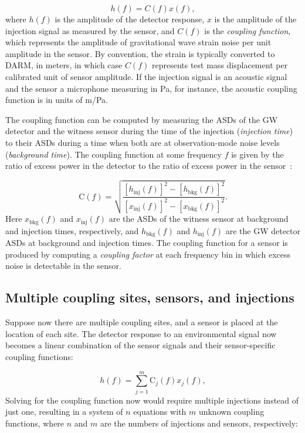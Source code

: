 \begin{equation}\label{eq:cf_model}
	h(f) = C(f) x(f),
\end{equation}
where $h(f)$ is the amplitude of the detector response, $x$ is the amplitude of the injection signal as measured by the sensor, and $C(f)$ is the \textit{coupling function}, which represents the amplitude of gravitational wave strain noise per unit amplitude in the sensor.
By convention, the strain is typically converted to \ac{DARM}, in meters, in which case $C(f)$ represents  test mass displacement per calibrated unit of sensor amplitude.
If the injection signal is an acoustic signal and the sensor a microphone measuring in Pa, for instance, the acoustic coupling function is in units of m/Pa.

The coupling function can be computed by measuring the \acp{ASD} of the \ac{GW} detector and the witness sensor during the time of the injection (\textit{injection time}) to their \acp{ASD} during a time when both are at observation-mode noise levels (\textit{background time}).
The coupling function at some frequency $f$ is given by the ratio of excess power in the detector to the ratio of excess power in the sensor~\citep{Kruk_2016, pem_code}:

\begin{equation}\label{eq:cf}
	\mathrm{C}(f) = \sqrt{\frac{[h_{\textrm{inj}}(f)]^2 - [h_{\textrm{bkg}}(f)]^2}{[x_{\textrm{inj}}(f)]^2 - [x_{\textrm{bkg}}(f)]^2}}.
\end{equation}
Here $x_{\textrm{bkg}}(f)$ and $x_{\textrm{inj}}(f)$ are the \acp{ASD} of the witness sensor at background and injection times, respectively, and $h_{\textrm{bkg}}(f)$ and $h_{\textrm{inj}}(f)$ are the \ac{GW} detector \acp{ASD} at background and injection times.
The coupling function for a sensor is produced by computing a \textit{coupling factor} at each frequency bin in which excess noise is detectable in the sensor.

\subsection{Multiple coupling sites, sensors, and injections}

Suppose now there are multiple coupling sites, and a sensor is placed at the location of each site.
The detector response to an environmental signal now becomes a linear combination of the sensor signals and their sensor-specific coupling functions:

\begin{equation}\label{eq:cf_model_expanded}
	h(f) = \sum_{j=1}^{m} \mathrm{C}_j(f) x_{j}(f),
\end{equation}
Solving for the coupling function now would require multiple injections instead of just one, resulting in a system of $n$ equations with $m$ unknown coupling functions, where $n$ and $m$ are the numbers of injections and sensors, respectively:

